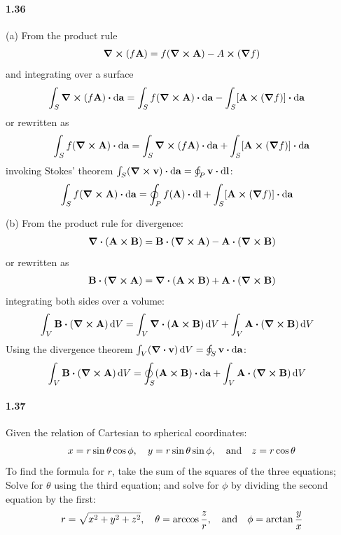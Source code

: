 \documentclass[../main.tex]{subfiles}
\begin{document}
\paragraph{1.36}
(a) From the product rule
\begin{align*}
    \curl(f\vb{A}) = f(\curl{\vb{A}}) - A \cp (\grad{f})
\end{align*}
and integrating over a surface
\begin{align*}
    \int_S \curl(f\vb{A}) \vdot \dd{\vb{a}} &= \int_S f(\curl{\vb{A}}) \vdot \dd{\vb{a}}
        - \int_S [\vb{A} \cp (\grad{f})] \vdot \dd{\vb{a}}
\end{align*}
or rewritten as
\begin{align*}
    \int_S f(\curl{\vb{A}}) \vdot \dd{\vb{a}} = \int_S \curl(f\vb{A}) \vdot \dd{\vb{a}}
        + \int_S [\vb{A} \cp (\grad{f})] \vdot \dd{\vb{a}}
\end{align*}
invoking Stokes' theorem 
$\int_S (\curl{\vb{v}}) \vdot \dd{\vb{a}} = \oint_P \vb{v} \vdot \dd{\vb{l}}$:
\begin{align*}
    \int_S f(\curl{\vb{A}}) \vdot \dd{\vb{a}} &= \oint_P f(\vb{A}) \vdot \dd{\vb{l}}
        + \int_S [\vb{A} \cp (\grad{f})] \vdot \dd{\vb{a}}
\end{align*}

(b) From the product rule for divergence:
\begin{align*}
    \div{(\vb{A} \cp \vb{B})} = \vb{B} \vdot (\curl{\vb{A}}) - \vb{A} \vdot (\curl{\vb{B}})
\end{align*}
or rewritten as
\begin{align*}
    \vb{B} \vdot (\curl{\vb{A}}) = \div{(\vb{A} \cp \vb{B})} + \vb{A} \vdot (\curl{\vb{B}})
\end{align*}
integrating both sides over a volume:
\begin{align*}
    \int_V \vb{B} \vdot (\curl{\vb{A}}) \dd{V} &= \int_V \div{(\vb{A} \cp \vb{B})} \dd{V}
        + \int_V \vb{A} \vdot (\curl{\vb{B}}) \dd{V}
\end{align*}
Using the divergence theorem $\int_V (\div{\vb{v}}) \dd{V} = \oint_S \vb{v} \vdot \dd{\vb{a}}$:
\begin{align*}
    \int_V \vb{B} \vdot (\curl{\vb{A}}) \dd{V} &= \oint_S (\vb{A} \cp \vb{B}) \vdot \dd{\vb{a}}
        + \int_V \vb{A} \vdot (\curl{\vb{B}}) \dd{V}
\end{align*}

\paragraph{1.37}
Given the relation of Cartesian to spherical coordinates:
\begin{align*}
    x = r\sin\theta \cos\phi, \quad y = r\sin\theta \sin\phi, \qand z = r\cos\theta
\end{align*}
To find the formula for $r$, take the sum of the squares of the three equations; Solve for $\theta$
using the third equation; and solve for $\phi$ by dividing the second equation by the first:
\begin{align*}
    r = \sqrt{x^2 + y^2 + z^2}, \quad \theta = \arccos{\frac{z}{r}}, \qand
    \phi = \arctan{\frac{y}{x}}
\end{align*}
\end{document}
